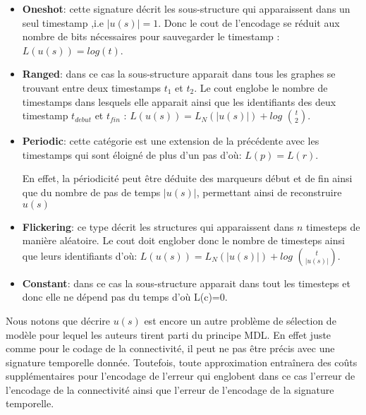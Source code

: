 			 \begin{itemize}[label=$\circ$]
			 \item \textbf{Oneshot}: cette signature décrit les sous-structure qui apparaissent dans un seul timestamp ,i.e $|u(s)|=1$. Donc le cout de l'encodage se réduit aux nombre de bits nécessaires pour sauvegarder le timestamp : $L(u(s)) = log(t)$.
			 \item \textbf{Ranged}: dans ce cas la sous-structure apparait dans tous les graphes se trouvant entre deux timestamps $t_{1}$ et $t_{2}$. Le cout englobe le nombre de timestamps dans lesquels elle apparait ainsi que les identifiants des deux timestamp $t_{debut}$ et $t_{fin}$ : $L(u(s)) = L_{N}(|u(s)|) +log$ ${t}\choose{2}$.
			 \item \textbf{Periodic}: cette catégorie est une extension   de la précédente avec les timestamps qui sont éloigné de plus d'un pas d'où: $L(p) = L(r)$.
			 
			 En effet, la périodicité peut être déduite des marqueurs début et de fin ainsi que du nombre de pas de temps $|u(s)|$, permettant ainsi de reconstruire $u(s)$
			 \item \textbf{Flickering}: ce type décrit les structures qui apparaissent dans $n$ timesteps de manière aléatoire. Le cout doit englober donc le nombre de timesteps ainsi que leurs identifiants d'où: 
			 $L(u(s)) = L_{N}(|u(s)|) +log$ ${t}\choose{|u(s)|}$.
			 \item \textbf{Constant}: dans ce cas la sous-structure apparait dans tout les timesteps et donc elle ne dépend pas du temps d'où L(c)=0.
			 \end{itemize}
			 
			 
			 Nous notons que décrire $u(s)$ est encore un autre problème de sélection de modèle pour lequel les auteurs tirent parti du principe MDL. En effet juste comme pour le codage de la connectivité, il peut ne pas être précis avec une signature temporelle donnée. Toutefois, toute approximation entraînera des coûts supplémentaires pour l'encodage de l'erreur qui englobent dans ce cas l'erreur de l'encodage de la connectivité ainsi que l'erreur de l'encodage de la signature temporelle.
			 
